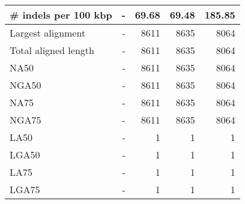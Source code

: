 \documentclass[12pt,a4paper]{article}
\begin{document}
\begin{table}[ht]
\begin{center}
\begin{tabular}{|l*{4}{|r}|}
\# indels per 100 kbp & - & 69.68 & 69.48 & 185.85 \\ \hline
Largest alignment & - & 8611 & 8635 & 8064 \\ \hline
Total aligned length & - & 8611 & 8635 & 8064 \\ \hline
NA50 & - & 8611 & 8635 & 8064 \\ \hline
NGA50 & - & 8611 & 8635 & 8064 \\ \hline
NA75 & - & 8611 & 8635 & 8064 \\ \hline
NGA75 & - & 8611 & 8635 & 8064 \\ \hline
LA50 & - & 1 & 1 & 1 \\ \hline
LGA50 & - & 1 & 1 & 1 \\ \hline
LA75 & - & 1 & 1 & 1 \\ \hline
LGA75 & - & 1 & 1 & 1 \\ \hline
\end{tabular}
\end{center}
\end{table}
\end{document}
